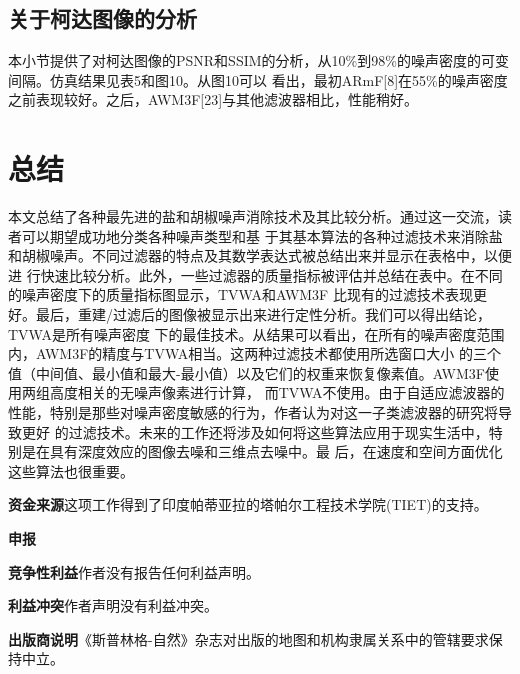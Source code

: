 \documentclass[12pt]{article} %
\begin{document}
\subsection{关于柯达图像的分析}
本小节提供了对柯达图像的PSNR和SSIM的分析，从10\%到98\%的噪声密度的可变间隔。仿真结果见表5和图10。从图10可以
看出，最初ARmF[8]在55\%的噪声密度之前表现较好。之后，AWM3F[23]与其他滤波器相比，性能稍好。

\section{总结\label{sec:5}}
本文总结了各种最先进的盐和胡椒噪声消除技术及其比较分析。通过这一交流，读者可以期望成功地分类各种噪声类型和基
于其基本算法的各种过滤技术来消除盐和胡椒噪声。不同过滤器的特点及其数学表达式被总结出来并显示在表格中，以便进
行快速比较分析。此外，一些过滤器的质量指标被评估并总结在表中。在不同的噪声密度下的质量指标图显示，TVWA和AWM3F
比现有的过滤技术表现更好。最后，重建/过滤后的图像被显示出来进行定性分析。我们可以得出结论，TVWA是所有噪声密度
下的最佳技术。从结果可以看出，在所有的噪声密度范围内，AWM3F的精度与TVWA相当。这两种过滤技术都使用所选窗口大小
的三个值（中间值、最小值和最大-最小值）以及它们的权重来恢复像素值。AWM3F使用两组高度相关的无噪声像素进行计算，
而TVWA不使用。由于自适应滤波器的性能，特别是那些对噪声密度敏感的行为，作者认为对这一子类滤波器的研究将导致更好
的过滤技术。未来的工作还将涉及如何将这些算法应用于现实生活中，特别是在具有深度效应的图像去噪和三维点去噪中。最
后，在速度和空间方面优化这些算法也很重要。

\vspace{1em}

\textbf{资金来源}\hspace{2em}这项工作得到了印度帕蒂亚拉的塔帕尔工程技术学院(TIET)的支持。

\vspace{1em}

\textbf{申报}

\vspace{1em}

\textbf{竞争性利益}\hspace{2em}作者没有报告任何利益声明。

\vspace{1em}

\textbf{利益冲突}\hspace{2em}作者声明没有利益冲突。

\printbibliography

\textbf{出版商说明}\hspace{2em}《斯普林格-自然》杂志对出版的地图和机构隶属关系中的管辖要求保持中立。
\end{document}
